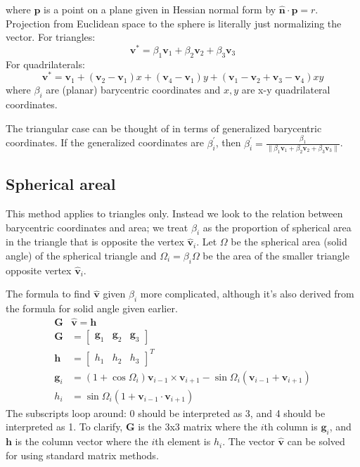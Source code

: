\documentclass{amsart}[12pt]
\begin{document}
where $\mathbf p$ is a point on a plane given in Hessian normal
form by $\hat{\mathbf n} \cdot \mathbf p = r$. Projection from Euclidean
space to the sphere is literally just normalizing the vector. For triangles:
\begin{equation}
   \mathbf v^* =
   \beta_1 \mathbf v_1 + \beta_2 \mathbf v_2 + \beta_3 \mathbf v_3
\end{equation}
For quadrilaterals:
\begin{equation}
   \mathbf v^* = \mathbf v_1 + (\mathbf v_2-\mathbf v_1) x +
   (\mathbf v_4-\mathbf v_1) y +
   (\mathbf v_1-\mathbf v_2+\mathbf v_3-\mathbf v_4)xy
 \end{equation}
where $\beta_i$ are (planar) barycentric coordinates and $x,y$ are
x-y quadrilateral coordinates.

The triangular case can be thought of in terms of generalized
barycentric coordinates. If the generalized coordinates are
$\beta^\prime_i$, then $\beta^\prime_i = \frac{\beta_1}
{\|\beta_1 \mathbf v_1 + \beta_2 \mathbf v_2 + \beta_3 \mathbf v_3\|}$.

\subsection{Spherical areal}
This method applies to triangles only. Instead we look to the relation between
barycentric coordinates and area; we treat $\beta_i$ as the proportion of
spherical area in the triangle that is opposite the vertex $\hat{\mathbf v}_i$.
Let $\Omega$ be the spherical area (solid angle) of the spherical triangle and
$\Omega_i = \beta_i\Omega$ be the area of the smaller triangle opposite vertex
$\hat{\mathbf v}_i$.

The formula to find $\hat{\mathbf v}$ given $\beta_i$ more complicated,
although it's also derived from the formula for solid angle given earlier.
\begin{equation}
\label{eq:sphareal}
  \begin{split}
  \mathbf G & \hat{\mathbf v} = \mathbf h \\
   \mathbf G & = \begin{bmatrix}
   \mathbf g_1 & \mathbf g_2 & \mathbf g_3 \end{bmatrix} \\
   \mathbf h & = \begin{bmatrix} h_1  & h_2 & h_3  \end{bmatrix}^T \\
   \mathbf g_{i} & = \left(1+\cos \Omega_{i}\right) \mathbf v_{i-1} \times
   \mathbf v_{i+1} - \sin\Omega_{i}\left(\mathbf v_{i-1} +
   \mathbf v_{i+1}\right)\\
   h_i &= \sin\Omega_i\left(1+\mathbf v_{i-1}\cdot\mathbf v_{i+1}\right)
\end{split}\end{equation}
The subscripts loop around: 0 should be interpreted as 3, and 4 should be
interpreted as 1. To clarify, $\mathbf G$ is the 3x3 matrix where the $i$th
column is $\mathbf g_i$, and $\mathbf h$ is the column vector where the
$i$th element is $h_i$. The vector $\hat{\mathbf v}$
can be solved for using standard matrix methods.
\end{document}
